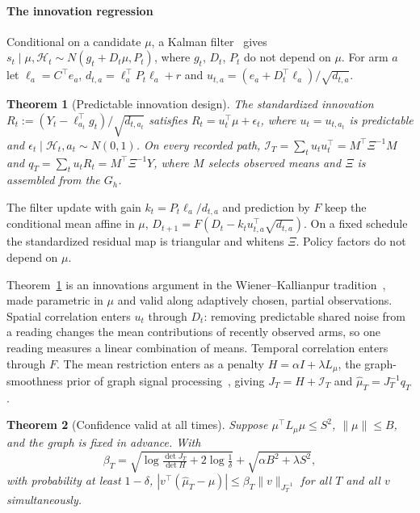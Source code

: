 \documentclass[conference]{IEEEtran}
\newtheorem{theorem}{Theorem}
\newcommand{\I}{\mathcal{I}}
\begin{document}
\paragraph*{The innovation regression} Conditional on a candidate $\mu$, a Kalman filter~\cite{kalman1960} gives $s_t\mid\mu,\mathcal H_t\sim N(g_t+D_t\mu,P_t)$, where $g_t$, $D_t$, $P_t$ do not depend on $\mu$. For arm $a$ let $\ell_a=C^\top e_a$, $d_{t,a}=\ell_a^\top P_t\ell_a+r$ and $u_{t,a}=(e_a+D_t^\top\ell_a)/\sqrt{d_{t,a}}$.

\begin{theorem}[Predictable innovation design]\label{thm:innov}
The standardized innovation $R_t:=(Y_t-\ell_{a_t}^\top g_t)/\sqrt{d_{t,a_t}}$ satisfies $R_t=u_t^\top\mu+\epsilon_t$, where $u_t=u_{t,a_t}$ is predictable and $\epsilon_t\mid\mathcal H_t,a_t\sim N(0,1)$. On every recorded path, $\I_T=\sum_tu_tu_t^\top=M^\top\Xi^{-1}M$ and $q_T=\sum_tu_tR_t=M^\top\Xi^{-1}Y$, where $M$ selects observed means and $\Xi$ is assembled from the $G_h$.
\end{theorem}

\begin{IEEEproof}[Sketch]
The filter update with gain $k_t=P_t\ell_a/d_{t,a}$ and prediction by $F$ keep the conditional mean affine in $\mu$, $D_{t+1}=F(D_t-k_tu_{t,a}^\top\sqrt{d_{t,a}})$. On a fixed schedule the standardized residual map is triangular and whitens $\Xi$. Policy factors do not depend on $\mu$.
\end{IEEEproof}

Theorem~\ref{thm:innov} is an innovations argument in the Wiener--Kallianpur tradition~\cite{wang2024innovation}, made parametric in $\mu$ and valid along adaptively chosen, partial observations. Spatial correlation enters $u_t$ through $D_t$: removing predictable shared noise from a reading changes the mean contributions of recently observed arms, so one reading measures a linear combination of means. Temporal correlation enters through $F$. The mean restriction enters as a penalty $H=\alpha I+\lambda L_\mu$, the graph-smoothness prior of graph signal processing~\cite{leone2024graphdenoising}, giving $J_T=H+\I_T$ and $\hat\mu_T=J_T^{-1}q_T$.

\begin{theorem}[Confidence valid at all times]\label{thm:conf}
Suppose $\mu^\top L_\mu\mu\le S^2$, $\|\mu\|\le B$, and the graph is fixed in advance. With
\[
\beta_T=\sqrt{\log\tfrac{\det J_T}{\det H}+2\log\tfrac1\delta}+\sqrt{\alpha B^2+\lambda S^2},
\]
with probability at least $1-\delta$, $|v^\top(\hat\mu_T-\mu)|\le\beta_T\|v\|_{J_T^{-1}}$ for all $T$ and all $v$ simultaneously.
\end{theorem}
\end{document}

